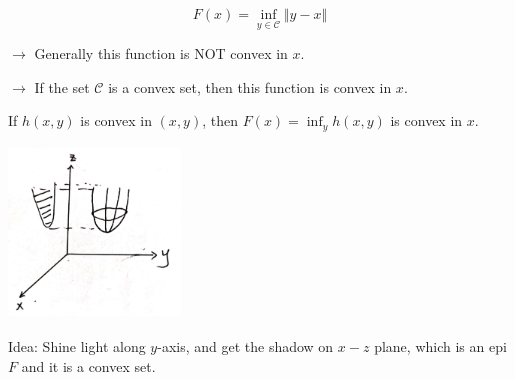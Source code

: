 \begin{example}
\begin{equation*}
F(x) =\inf_{y\in \mathcal{C}}\Vert y-x\Vert
\end{equation*}

$\rightarrow$ Generally this function is NOT convex in $x$.

$\rightarrow$ If the set $\mathcal{C}$ is a convex set, then this function is convex in $x$. 
\end{example}




\begin{theorem}
 If $h(x, y)$ is convex in $(x,y)$, then $F(x) = \inf_yh(x,y)$ is convex in $x$.
\end{theorem}

\begin{marginfigure}
	\centering
	\includegraphics[width=1.8in,height=1.8in]{figures/ch08/figure1104_2.png}
\end{marginfigure}

Idea: Shine light along $y$-axis, and get the shadow on $x-z$ plane, which is an epi $F$ and it is a convex set. 

